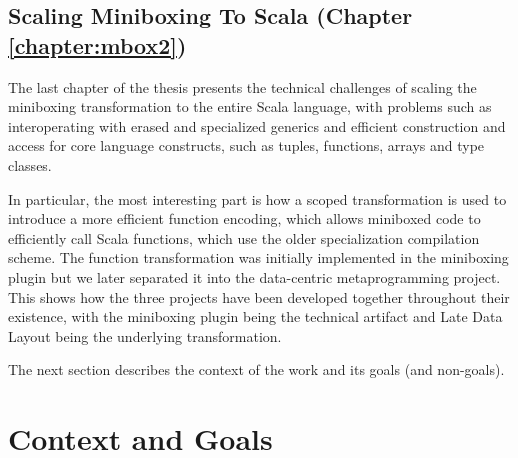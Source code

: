 %
%

\subsection{Scaling Miniboxing To Scala (Chapter \ref{chapter:mbox2})}

The last chapter of the thesis presents the technical challenges of scaling the miniboxing transformation to the entire Scala language, with problems such as interoperating with erased and specialized generics and efficient construction and access for core language constructs, such as tuples, functions, arrays and type classes.

In particular, the most interesting part is how a scoped transformation is used to introduce a more efficient function encoding, which allows miniboxed code to efficiently call Scala functions, which use the older specialization compilation scheme. The function transformation was initially implemented in the miniboxing plugin but we later separated it into the data-centric metaprogramming project. This shows how the three projects have been developed together throughout their existence, with the miniboxing plugin being the technical artifact and Late Data Layout being the underlying transformation.

The next section describes the context of the work and its goals (and non-goals).

\section{Context and Goals}

